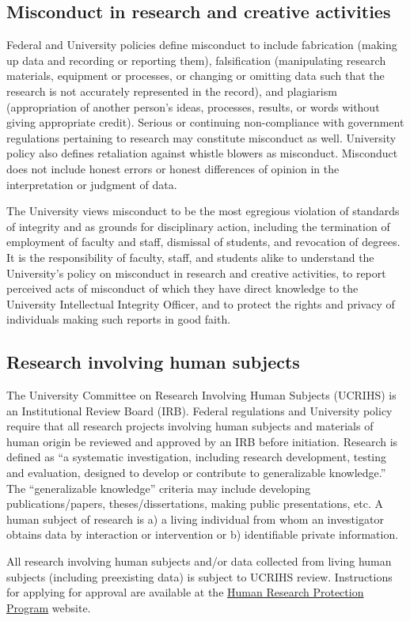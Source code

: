 \subsection{Misconduct in research and creative activities}

Federal and University policies define misconduct to include
fabrication (making up data and recording or reporting them),
falsification (manipulating research materials, equipment or
processes, or changing or omitting data such that the research is not
accurately represented in the record), and plagiarism (appropriation
of another person's ideas, processes, results, or words without giving
appropriate credit). Serious or continuing non-compliance with
government regulations pertaining to research may constitute
misconduct as well. University policy also defines retaliation against
whistle blowers as misconduct. Misconduct does not include honest
errors or honest differences of opinion in the interpretation or
judgment of data. 

The University views misconduct to be the most egregious violation of
standards of integrity and as grounds for disciplinary action,
including the termination of employment of faculty and staff,
dismissal of students, and revocation of degrees. It is the
responsibility of faculty, staff, and students alike to understand the
University's policy on misconduct in research and creative activities,
to report perceived acts of misconduct of which they have direct
knowledge to the University Intellectual Integrity Officer, and to
protect the rights and privacy of individuals making such reports in
good faith. 

\subsection{Research involving human subjects}
\label{sec:human_subjects}

The University Committee on Research Involving Human Subjects (UCRIHS)
is an Institutional Review Board (IRB). Federal regulations and
University policy require that all research projects involving human
subjects and materials of human origin be reviewed and approved by an
IRB before initiation. Research is defined as ``a systematic
investigation, including research development, testing and evaluation,
designed to develop or contribute to generalizable knowledge.'' The
``generalizable knowledge'' criteria may include developing
publications/papers, theses/dissertations, making public
presentations, etc. A human subject of research is a) a living
individual from whom an investigator obtains data by interaction or
intervention or b) identifiable private information.  

All research involving human subjects and/or data collected from
living human subjects (including preexisting data) is subject to
UCRIHS review. Instructions for applying for approval are available at
the \href{http://hrpp.msu.edu/}{Human Research Protection Program}
website.

